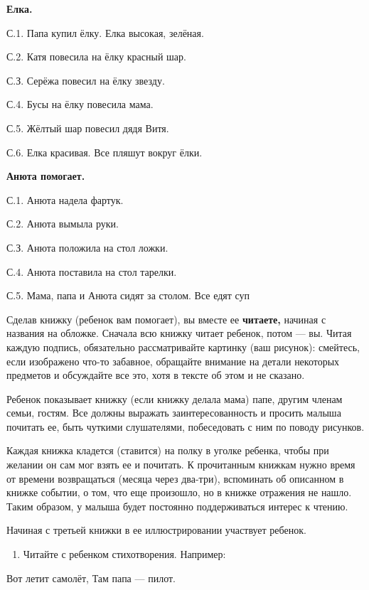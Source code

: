\documentclass{book}
\begin{document}
\textbf{Елка.}

С.1. Папа купил ёлку. Елка высокая, зелёная.

С.2. Катя повесила на ёлку красный шар.

С.З. Серёжа повесил на ёлку звезду.

С.4. Бусы на ёлку повесила мама.

С.5. Жёлтый шар повесил дядя Витя.

С.6. Елка красивая. Все пляшут вокруг ёлки.

\textbf{Анюта помогает.}

С.1. Анюта надела фартук.

С.2. Анюта вымыла руки.

С.З. Анюта положила на стол ложки.

С.4. Анюта поставила на стол тарелки.

С.5. Мама, папа и Анюта сидят за столом. Все едят суп

Сделав книжку (ребенок вам помогает), вы вместе ее \textbf{читаете,}
начиная с названия на обложке. Сначала всю книжку читает ребенок, потом
--- вы. Читая каждую подпись, обязательно рассматривайте картинку (ваш
рисунок): смейтесь, если изображено что-то забавное, обращайте внимание
на детали некоторых предметов и обсуждайте все это, хотя в тексте об
этом и не сказано.

Ребенок показывает книжку (если книжку делала мама) папе, другим членам
семьи, гостям. Все должны выражать заинтересованность и просить малыша
почитать ее, быть чуткими слушателями, побеседовать с ним по поводу
рисунков.

Каждая книжка кладется (ставится) на полку в уголке ребенка, чтобы при
желании он сам мог взять ее и почитать. К прочитанным книжкам нужно
время от времени возвращаться (месяца через два-три), вспоминать об
описанном в книжке событии, о том, что еще произошло, но в книжке
отражения не нашло. Таким образом, у малыша будет постоянно
поддерживаться интерес к чтению.

Начиная с третьей книжки в ее иллюстрировании участвует ребенок.


\begin{enumerate}
\def\labelenumi{\arabic{enumi}.}
\setcounter{enumi}{4}
\item
  
  Читайте с ребенком стихотворения. Например:
  
\end{enumerate}


Вот летит самолёт, Там папа --- пилот.
\end{document}
